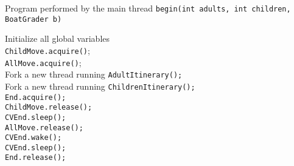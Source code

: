 \documentclass{article}
\begin{document}
\begin{spacing}{1.1}
    \begin{algorithm}
      \caption{Program performed by the main thread \texttt{begin(int adults, int children, BoatGrader b)}}
      \begin{algorithmic}[1]
	\STATE Initialize all global variables\\
	\STATE \texttt{ChildMove.acquire()}; \\
	\STATE \texttt{AllMove.acquire()};\\
	\STATE Fork a new thread running \texttt{AdultItinerary();}\\
	\ENDFOR
	\STATE Fork a new thread running \texttt{ChildrenItinerary();}\\
	\ENDFOR
	\STATE \texttt{End.acquire();}\\
	\STATE \texttt{ChildMove.release();}\\
	\STATE \texttt{CVEnd.sleep();}\\
	\STATE \texttt{AllMove.release();}\\
	\STATE \texttt{CVEnd.wake();}\\
	\STATE \texttt{CVEnd.sleep();}\\
	\STATE \texttt{End.release();}\\
	\RETURN
      \end{algorithmic}
    \end{algorithm}


\end{spacing}
\end{document}
